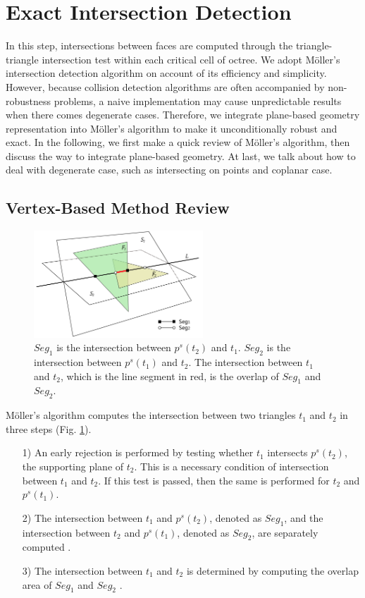 \documentclass[10pt,journal,compsoc]{IEEEtran}
\begin{document}
\section{Exact Intersection Detection}

\label{section:isect}
In this step, intersections between faces are computed through the triangle-triangle intersection test within each critical cell of octree. We adopt M\"{o}ller's intersection detection algorithm \cite{moller1997fast} on account of its efficiency and simplicity. However, because collision detection algorithms are often accompanied by non-robustness problems, a naive implementation may cause unpredictable results when there comes degenerate cases. Therefore, we integrate plane-based geometry representation into M\"{o}ller's algorithm to make it unconditionally robust and exact. In the following, we first make a quick review of M\"{o}ller's algorithm, then discuss the way to integrate plane-based geometry. At last, we talk about how to deal with degenerate case, such as intersecting on points and coplanar case.

\subsection{Vertex-Based Method Review}

\begin{figure}[t]
\centering
\includegraphics[width=2.5in]{projection}
\caption{$Seg_1$ is the intersection between $p^s(t_2)$ and $t_1$. $Seg_2$ is the intersection between $p^s(t_1)$ and $t_2$. The intersection between $t_1$ and $t_2$, which is the line segment in red, is the overlap of $Seg_1$ and $Seg_2$.}
\label{fig_projection}
\end{figure}


M\"{o}ller's algorithm computes the intersection between two triangles $t_1$ and $t_2$ in three steps (Fig. \ref{fig_projection}).
\begin{itemize}[leftmargin=0.45cm]
\item[1)] An early rejection is performed by testing whether $t_1$ intersects $p^s(t_2)$, the supporting plane of $t_2$. This is a necessary condition of intersection between $t_1$ and $t_2$. If this test is passed, then the same is performed for $t_2$ and $p^s(t_1)$.
\item[2)]The intersection between $t_1$ and $p^s(t_2)$, denoted as $Seg_1$, and the intersection between $t_2$ and $p^s(t_1)$, denoted as $Seg_2$, are separately computed .
 \item[3)]The intersection between $t_1$ and $t_2$ is determined by computing the overlap area of $Seg_1$ and $Seg_2$ .
\end{itemize}
\end{document}
